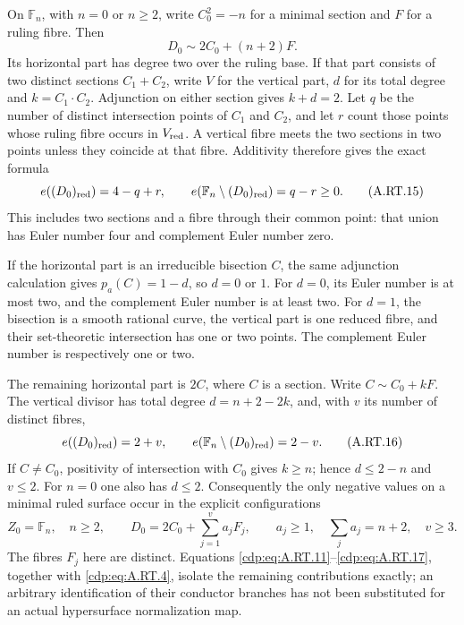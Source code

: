On $\mathbb F_n$, with $n=0$ or $n\ge2$, write $C_0^2=-n$
for a minimal section and $F$ for a ruling fibre. Then
\[
 D_0\sim 2C_0+(n+2)F.
 \tag{A.RT.14}\label{cdp:eq:A.RT.14}
\]
Its horizontal part has degree two over the ruling base.
If that part consists of two distinct sections $C_1+C_2$,
write $V$ for the vertical part, $d$ for its total degree and
$k=C_1\cdot C_2$. Adjunction on either section gives
$k+d=2$. Let $q$ be the number of distinct intersection
points of $C_1$ and $C_2$, and let $r$ count those points
whose ruling fibre occurs in $V_{\rm red}$. A vertical fibre
meets the two sections in two points unless they coincide at
that fibre. Additivity therefore gives the exact formula
\[
 e((D_0)_{\rm red})=4-q+r,
 \qquad e(\mathbb F_n\setminus(D_0)_{\rm red})=q-r\ge0.
 \tag{A.RT.15}\label{cdp:eq:A.RT.15}
\]
This includes two sections and a fibre through their common
point: that union has Euler number four and complement Euler
number zero.

If the horizontal part is an irreducible bisection $C$, the
same adjunction calculation gives $p_a(C)=1-d$, so $d=0$
or $1$. For $d=0$, its Euler number is at most two, and the
complement Euler number is at least two. For $d=1$, the
bisection is a smooth rational curve, the vertical part is one
reduced fibre, and their set-theoretic intersection has one or
two points. The complement Euler number is respectively one
or two.

The remaining horizontal part is $2C$, where $C$ is a section.
Write $C\sim C_0+kF$. The vertical divisor has total degree
$d=n+2-2k$, and, with $v$ its number of distinct fibres,
\[
 e((D_0)_{\rm red})=2+v,
 \qquad e(\mathbb F_n\setminus(D_0)_{\rm red})=2-v.
 \tag{A.RT.16}\label{cdp:eq:A.RT.16}
\]
If $C\ne C_0$, positivity of intersection with $C_0$ gives
$k\ge n$; hence $d\le2-n$ and $v\le2$.
For $n=0$ one also has $d\le2$. Consequently the only
negative values on a minimal ruled surface occur in the
explicit configurations
\[
 Z_0=\mathbb F_n,\quad n\ge2,\qquad
 D_0=2C_0+\sum_{j=1}^{v}a_jF_j,\qquad
 a_j\ge1,\quad \sum_j a_j=n+2,\quad v\ge3.
 \tag{A.RT.17}\label{cdp:eq:A.RT.17}
\]
The fibres $F_j$ here are distinct. Equations
\eqref{cdp:eq:A.RT.11}--\eqref{cdp:eq:A.RT.17}, together with \eqref{cdp:eq:A.RT.4}, isolate the
remaining contributions exactly; an arbitrary identification
of their conductor branches has not been substituted for an
actual hypersurface normalization map.

